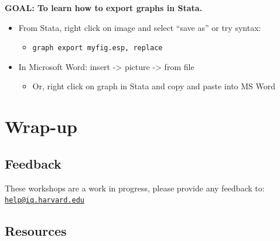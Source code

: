 \documentclass[
]{book}
\providecommand{\tightlist}{%
  \setlength{\itemsep}{0pt}\setlength{\parskip}{0pt}}
\begin{document}
\textbf{GOAL: To learn how to export graphs in Stata.}

\begin{itemize}
\tightlist
\item
  From Stata, right click on image and select ``save as'' or try syntax:

  \begin{itemize}
  \tightlist
  \item
    \texttt{graph\ export\ myfig.esp,\ replace}
  \end{itemize}
\item
  In Microsoft Word: insert -\textgreater{} picture -\textgreater{} from file

  \begin{itemize}
  \tightlist
  \item
    Or, right click on graph in Stata and copy and paste into MS Word
  \end{itemize}
\end{itemize}

\hypertarget{wrap-up-10}{%
\section{Wrap-up}\label{wrap-up-10}}

\hypertarget{feedback-10}{%
\subsection{Feedback}\label{feedback-10}}

These workshops are a work in progress, please provide any feedback to: \href{mailto:help@iq.harvard.edu}{\nolinkurl{help@iq.harvard.edu}}

\hypertarget{resources-13}{%
\subsection{Resources}\label{resources-13}}
\end{document}
